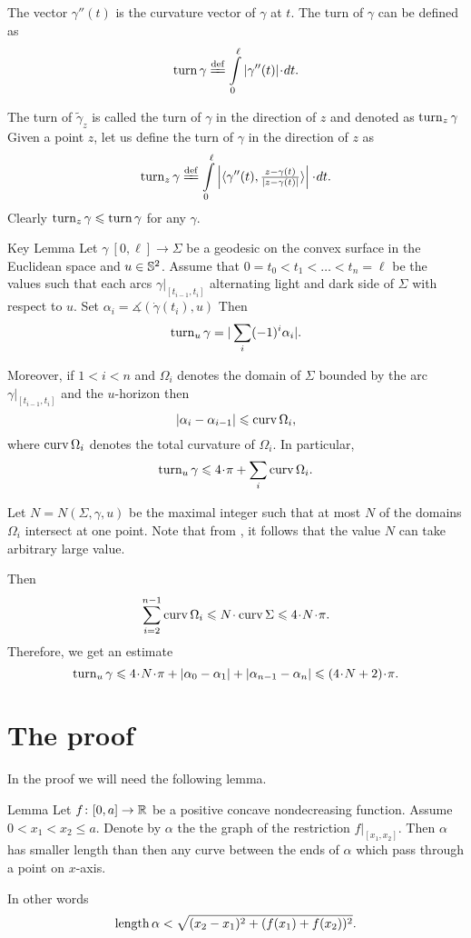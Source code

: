 \documentclass[a4paper,10pt]{amsart}
\begin{document}
The vector $\gamma''(t)$ is the curvature vector of $\gamma$ at $t$.
The turn of $\gamma$ can be defined as 
\[\turn\gamma\df\int\limits_0^\ell|\gamma''(t)|\cdot dt.\]

The turn of $\tilde\gamma_z$ is called the turn of $\gamma$ in the direction of $z$ and denoted as $\mathop{\rm turn}\nolimits_z\gamma$
Given a point $z$, let us define the turn of $\gamma$ in the direction of $z$ as
\[\turn_z\gamma
\df
\int\limits_0^\ell
\left|
\langle\gamma''(t),\tfrac{z-\gamma(t)}{|z-\gamma(t)|}\rangle
\right|
\cdot dt.\]
Clearly $\mathop{\rm turn}\nolimits_z\gamma\leqslant \mathop{\rm turn}\nolimits \gamma$ for any $\gamma$.

\begin{thm}{Key Lemma}
\label{lem:key}
Let $\gamma\:[0,\ell]\to \Sigma$ be a geodesic on the convex surface in the Euclidean space 
and $u\in\mathbb{S}^2$.
Assume that $0=t_0<t_1<\dots<t_n=\ell$ be the values such that each arcs $\gamma|_{[t_{i-1},t_i]}$ alternating light and dark side of $\Sigma$ with respect to $u$.
Set $\alpha_i=\measuredangle(\dot\gamma(t_i),u)$
Then 
\[\mathop{\rm turn}\nolimits_u\gamma=|\sum_i(-1)^i\alpha_i|.\]

Moreover, if $1<i<n$ 
and $\Omega_i$ denotes the domain of $\Sigma$ bounded by the arc $\gamma|_{[t_{i-1},t_i]}$ and the $u$-horizon then 
\[|\alpha_i-\alpha_{i-1}|\leqslant \mathop{\rm curv}\nolimits\Omega_i,\]
where $\mathop{\rm curv}\nolimits\Omega_i$ denotes the total curvature of $\Omega_i$.
In particular,
\[\turn_u\gamma\le 4\cdot\pi+\sum_i\curv\Omega_i.\]
\end{thm}

Let $N=N(\Sigma,\gamma, u)$ be the maximal integer such that at most $N$ of the domains $\Omega_i$ intersect at one point.
Note that from \cite{BKZ}, it follows that the value $N$ can take arbitrary large value.

Then
\[\sum_{i=2}^{n-1}\curv\Omega_i
\le 
N\cdot\curv\Sigma
\le 
4\cdot N\cdot\pi.\]
Therefore, we get an estimate
\[\turn_u\gamma
\le 
4\cdot N\cdot\pi+|\alpha_0-\alpha_1|+|\alpha_{n-1}-\alpha_n|
\le
(4\cdot N+2)\cdot\pi.\]


\section{The proof}

In the proof we will need the following lemma.

\begin{thm}{Lemma}\label{lem:1}
Let $f\colon[0,a]\to\mathbb{R}$ be a positive concave nondecreasing function.
Assume  $0<x_1<x_2\le a$.
Denote by $\alpha$ the the graph of the restriction $f|_{[x_1,x_2]}$.
Then $\alpha$ has smaller length than then any curve between the ends of $\alpha$ which pass through a point on $x$-axis.

In other words 
\[\mathop{\rm length}\nolimits\alpha<\sqrt{(x_2-x_1)^2+(f(x_1)+f(x_2))^2}.\]

\end{thm}
\end{document}
